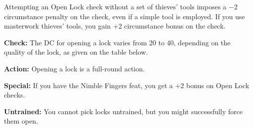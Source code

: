 Attempting an Open Lock check without a set of thieves' tools imposes a $-2$ circumstance penalty on the check, even if a simple tool is employed. If you use masterwork thieves' tools, you gain +2 circumstance bonus on the check.

\textbf{Check:} The DC for opening a lock varies from 20 to 40, depending on the quality of the lock, as given on the table below.


\textbf{Action:} Opening a lock is a full-round action.

\textbf{Special:} If you have the Nimble Fingers feat, you get a +2 bonus on Open Lock checks.

\textbf{Untrained:} You cannot pick locks untrained, but you might successfully force them open.
